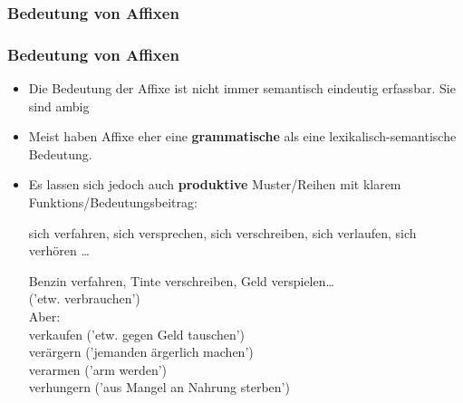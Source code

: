 \subsubsection{Bedeutung von Affixen}

\begin{frame}
\frametitle{Bedeutung von Affixen}

\begin{itemize}
	\item Die Bedeutung der Affixe ist nicht immer semantisch eindeutig erfassbar. Sie sind ambig \citep[vgl.][]{Fries&MyP16k}

	\item Meist haben Affixe eher eine \textbf{grammatische} als eine lexikalisch-semantische Bedeutung. 

	\item Es lassen sich jedoch auch \textbf{produktive} Muster/Reihen mit klarem Funktions/Bedeutungsbeitrag:
	
	\ea sich verfahren, sich versprechen, sich verschreiben, sich verlaufen, sich verhören \dots \\
	\ras {}
	\z
	
	\ea Benzin verfahren, Tinte verschreiben, Geld verspielen\dots \\
\ras ('etw. verbrauchen')\\
Aber:\\
verkaufen ('etw. gegen Geld tauschen')\\
verärgern ('jemanden ärgerlich machen')\\
verarmen ('arm werden')\\
verhungern ('aus Mangel an Nahrung sterben')
	\z

\end{itemize}


\end{frame}




